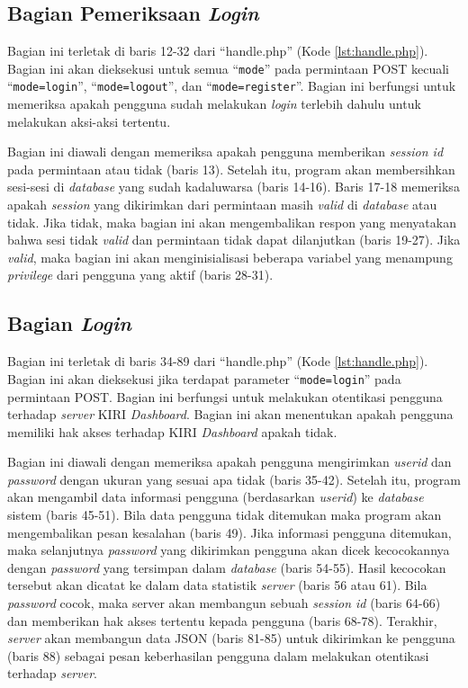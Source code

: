 \subsection{Bagian Pemeriksaan \textit{Login}}
\label{sec:pemeriksaanlogin}
Bagian ini terletak di baris 12-32 dari ``handle.php'' (Kode \ref{lst:handle.php}). Bagian ini akan dieksekusi untuk semua ``\texttt{mode}'' pada permintaan POST kecuali ``\texttt{mode=login}'', ``\texttt{mode=logout}'', dan ``\texttt{mode=register}''. Bagian ini berfungsi untuk memeriksa apakah pengguna sudah melakukan \textit{login} terlebih dahulu untuk melakukan aksi-aksi tertentu.

Bagian ini diawali dengan memeriksa apakah pengguna memberikan \textit{session id} pada permintaan atau tidak (baris 13). Setelah itu, program akan membersihkan sesi-sesi di \textit{database} yang sudah kadaluwarsa (baris 14-16). Baris 17-18 memeriksa apakah \textit{session} yang dikirimkan dari permintaan masih \textit{valid} di \textit{database} atau tidak. Jika tidak, maka bagian ini akan mengembalikan respon yang menyatakan bahwa sesi tidak \textit{valid} dan permintaan tidak dapat dilanjutkan (baris 19-27). Jika \textit{valid}, maka bagian ini akan menginisialisasi beberapa variabel yang menampung \textit{privilege} dari pengguna yang aktif (baris 28-31).

\subsection{Bagian \textit{Login}}
\label{sec:bagianlogin}
Bagian ini terletak di baris 34-89 dari ``handle.php'' (Kode \ref{lst:handle.php}). Bagian ini akan dieksekusi jika terdapat parameter ``\texttt{mode=login}'' pada permintaan POST. Bagian ini berfungsi untuk melakukan otentikasi pengguna terhadap \textit{server} KIRI \textit{Dashboard}. Bagian ini akan menentukan apakah pengguna memiliki hak akses terhadap KIRI \textit{Dashboard} apakah tidak.

Bagian ini diawali dengan memeriksa apakah pengguna mengirimkan \textit{userid} dan \textit{password} dengan ukuran yang sesuai apa tidak (baris 35-42). Setelah itu, program akan mengambil data informasi pengguna (berdasarkan \textit{userid}) ke \textit{database} sistem (baris 45-51). Bila data pengguna tidak ditemukan maka program akan mengembalikan pesan kesalahan (baris 49). Jika informasi pengguna ditemukan, maka selanjutnya \textit{password} yang dikirimkan pengguna akan dicek kecocokannya dengan \textit{password} yang tersimpan dalam \textit{database} (baris 54-55). Hasil kecocokan tersebut akan dicatat ke dalam data statistik \textit{server} (baris 56 atau 61). Bila \textit{password} cocok, maka server akan membangun sebuah \textit{session id} (baris 64-66) dan memberikan hak akses tertentu kepada pengguna (baris 68-78). Terakhir, \textit{server} akan membangun data JSON (baris 81-85) untuk dikirimkan ke pengguna (baris 88) sebagai pesan keberhasilan pengguna dalam melakukan otentikasi terhadap \textit{server}.

